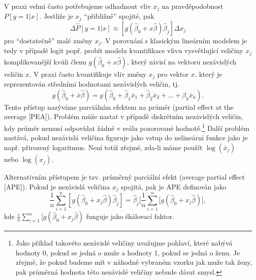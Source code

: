 V praxi velmi často potřebujeme odhadnout vliv $x_j$ na pravděpodobnost $P[y = 1 | x]$. Jestliže je $x_j$ ``přibližně'' spojité, pak
\begin{equation}
\Delta \hat{P}[y = 1 | x] \approx [g(\hat{\beta}_0 + x \hat{\beta})\hat{\beta}_j]\Delta x_j
\end{equation}
pro ``dostatečně'' malé změny $x_j$. V porovnání s klasickým lineárním modelem je tedy v případě logit popř. probit modelu kvantifikace vlivu vysvětlující veličiny $x_j$ komplikovanější kvůli členu $g(\hat{\beta}_0 + x \hat{\beta})$, který závisí na vektoru nezávislých veličin $x$. V praxi často kvantifikuje vliv změny $x_j$ pro vektor $x$, který je reprezentován středními hodnotami nezávislých veličin, tj.
\begin{equation}
g(\hat{\beta}_0 + \overline{x} \hat{\beta}) = g(\hat{\beta}_0 + \hat{\beta}_1 \overline{x}_1 + \hat{\beta}_2 \overline{x}_2 + ... + \hat{\beta}_k \overline{x}_k).
\end{equation}
Tento přístup nazýváme parciálním efektem na průměr (partial effect at the average [PEA]). Problém může nastat v případě diskrétním nezávislých veličin, kdy průměr nemusí odpovídat žádné v reálu pozorované hodnotě.\footnote{Jako příklad takovéto nezávislé veličiny uvažujme pohlaví, které nabývá hodnoty 0, pokud se jedná o muže a hodnoty 1, pokud se jedná o ženu. Je zřejmě, že pokud budeme mít v náhodně vybraném vzorku jak muže tak ženy, pak průměrná hodnota této nezávislé veličiny nebude dávat smysl.} Další problém nastává, pokud nezávislá veličina figuruje jako vstup do nelineární funkce jako je např. přirozený logaritmus. Není totiž zřejmé, zda-li máme použít $\log(\overline{x}_j)$ nebo $\overline{\log(x_j)}$.

Alternativním přístupem je tzv. průměrný parciální efekt (average partial effect [APE]). Pokud je nezávislá veličina $x_j$ spojitá, pak je APE definován jako
\begin{equation}
\frac{1}{n}\sum_{i = 1}^n [g(\hat{\beta}_0 + x_j \hat{\beta})\hat{\beta}_j] = \hat{\beta}_j\Big[\frac{1}{n}\sum_{i = 1}^n [g(\hat{\beta}_0 + x_j \hat{\beta})\Big],
\end{equation}
kde $\frac{1}{n}\sum_{i = 1}^n [g(\hat{\beta}_0 + x_j \hat{\beta})$ funguje jako škálovací faktor.

